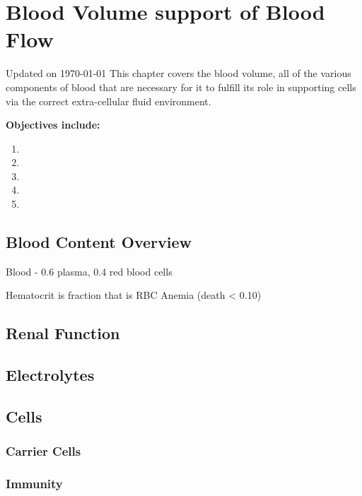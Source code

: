 \chapter{Blood Volume support of Blood Flow}\label{chp:blood_content}
Updated on \today
\minitoc
This chapter covers the blood volume, all of the various components of blood that are necessary for it to fulfill its role in supporting cells via the correct extra-cellular fluid environment.

\vspace{5mm}

\textbf{Objectives include:}
\begin{enumerate}
    \item
    \item
    \item
    \item
    \item
\end{enumerate}

\section{Blood Content Overview}

Blood - 0.6 plasma, 0.4 red blood cells 

Hematocrit is fraction that is RBC
Anemia (death < 0.10)

\section{Renal Function}

\section{Electrolytes}

\section{Cells}

\subsection{Carrier Cells}

\subsection{Immunity}

